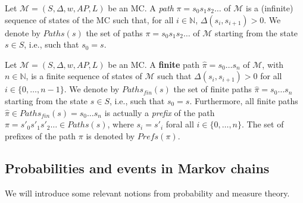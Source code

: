 \begin{definition} Let $\mathcal{M} = (S, \Delta, w, AP, L)$ be an MC.
A \textit{path} $\pi = s_0 s_1 s_2 \dots$ of $\mathcal{M}$ is a (infinite) sequence of states of the MC such that, for all $i \in \mathbb{N}$, $\Delta(s_i, s_{i+1})> 0$. We denote by $Paths(s)$ the set of paths $\pi = s_0s_1s_2\dots$ of $\mathcal{M}$ starting from the state $s \in S$, i.e., such that $s_0 = s$.
\end{definition}
\begin{definition}
Let $\mathcal{M} = (S, \Delta, w, AP, L)$ be an MC.
A \textbf{finite} path $\hat{\pi} = s_0 \dots s_n$ of $\mathcal{M}$, with $n \in \mathbb{N}$, is a finite sequence of states of $\mathcal{M}$ such that $\Delta(s_i, s_{i+1}) > 0$ for all $i \in \{0, \dots, n-1\}$.
We denote by $Paths_{fin}(s)$ the set of finite paths $\hat{\pi} = s_0 \dots s_n$ starting from the state $s \in S$, i.e., such that $s_0 = s$. Furthermore, all finite paths $\hat{\pi}\in Paths_{fin}(s) = s_0\dots s_n$ is actually a \textit{prefix} of the path
$\pi = s'_0s'_1s'_2 \dots \in Paths(s)$, where $s_i = s'_i$ foral all $i \in \{0, \dots, n\}$. The set of prefixes of the path $\pi$ is denoted by $Prefs(\pi)$.
\end{definition}

\subsection{Probabilities and events in Markov chains}
We will introduce some relevant notions from probability and measure theory.

